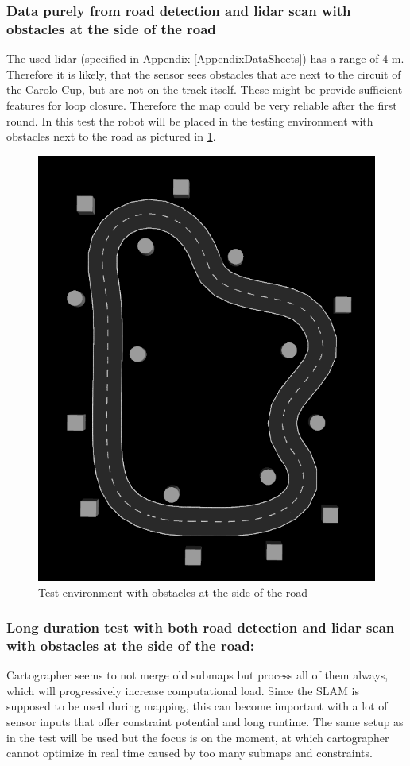\subsubsection{Data purely from road detection and lidar scan with obstacles at the side of the road}
The used lidar (specified in Appendix \ref{AppendixDataSheets}) has a range of 4 m. Therefore it is likely, that the sensor sees obstacles that are next to the circuit of the Carolo-Cup, but are not on the track itself. These might be provide sufficient features for loop closure. Therefore the map could be very reliable after the first round. 
In this test the robot will be placed in the testing environment with obstacles next to the road as pictured in \ref{2slamtestenv}.

\begin{figure}[H]
	\includegraphics[width=.4\textwidth]{Pictures/2slamtest}
	\caption{Test environment with obstacles at the side of the road}
	\label{2slamtestenv}
\end{figure}

\subsubsection{Long duration test with both road detection and lidar scan with obstacles at the side of the road:}
Cartographer seems to not merge old submaps but process all of them always, which will progressively increase computational load. Since the SLAM is supposed to be used during mapping, this can become important with a lot of sensor inputs that offer constraint potential and long runtime.
The same setup as in the  test will be used but the focus is on the moment, at which cartographer cannot optimize in real time caused by too many submaps and constraints.\\


